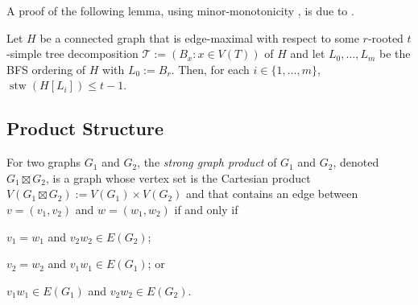 \documentclass[kpfonts]{patmorin}
\DeclareMathOperator{\stw}{stw}
\theoremstyle{named}
\begin{document}
%

A proof of the following lemma, using minor-monotonicity \cite[Theorem~5.2]{wulf:stacked}, is due to \citet{wood:personal}.

\begin{lem}\label{simple-bfs-layers}
    Let $H$ be a connected graph that is edge-maximal with respect to some $r$-rooted $t$-simple tree decomposition $\mathcal{T}:=(B_x:x\in V(T))$ of $H$ and let $L_0,\ldots,L_m$ be the BFS ordering of $H$ with $L_0:=B_r$.   Then, for each $i\in\{1,\ldots,m\}$, $\stw(H[L_i])\le t-1$.
\end{lem}




\subsection{Product Structure}

For two graphs $G_1$ and $G_2$, the \emph{strong graph product} of $G_1$ and $G_2$, denoted $G_1\boxtimes G_2$, is a graph whose vertex set is the Cartesian product $V(G_1\boxtimes G_2):= V(G_1)\times V(G_2)$ and that contains an edge between $v=(v_1,v_2)$ and $w=(w_1,w_2)$ if and only if
\begin{inparaenum}[(i)]
    \item $v_1=w_1$ and $v_2w_2\in E(G_2)$;
    \item $v_2=w_2$ and $v_1w_1\in E(G_1)$; or
    \item $v_1w_1\in E(G_1)$ and $v_2w_2\in E(G_2)$.
\end{inparaenum}
\end{document}
